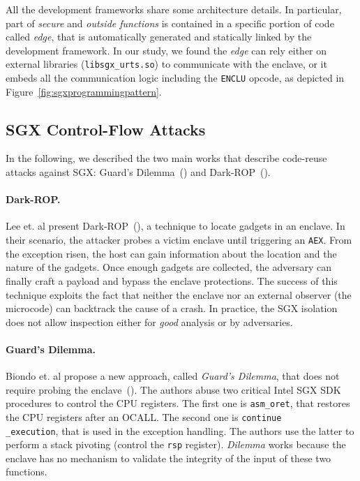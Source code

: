 All the development frameworks share some architecture details.
In particular, part of \emph{secure} and \emph{outside functions} is contained 
in a specific portion of code called \emph{edge}, that is automatically 
generated and statically linked by the development framework.
In our study, we found the \emph{edge} can rely either on external libraries 
(\eg \texttt{libsgx\_urts.so}) to communicate with the enclave, or it embeds
all the communication logic including the \texttt{ENCLU} opcode, as depicted in 
Figure~\ref{fig:sgxprogrammingpattern}.

\subsection{SGX Control-Flow Attacks}
\label{ssec:sgx-control-flow-attacks}

In the following, we described the two main works that describe code-reuse 
attacks against SGX: Guard's Dilemma~(\cite{biondo2018guard}) and 
Dark-ROP~(\cite{lee2017hacking}).

\paragraph{Dark-ROP.}
Lee et. al present Dark-ROP~(\cite{lee2017hacking}), a technique to locate 
gadgets in an enclave.
In their scenario, the attacker probes
a victim enclave until triggering an \texttt{AEX}.
From the exception risen, the host can gain information about the location and 
the nature of the gadgets.
Once enough gadgets are collected, the adversary can finally craft a payload 
and bypass the enclave protections.
The success of this technique exploits the fact that neither the enclave 
nor an external observer (\eg the microcode) can backtrack the cause of a 
crash.
In practice, the SGX isolation does not allow inspection either for 
\emph{good} analysis or by adversaries.

\paragraph{Guard's Dilemma.}
Biondo et. al propose a new approach, called \emph{Guard's Dilemma}, that does 
not require probing the enclave~(\cite{biondo2018guard}).
The authors abuse two critical Intel SGX SDK procedures to control the CPU 
registers.
The first one is \texttt{asm\_oret}, that restores the CPU registers after an  
OCALL.
The second one is \texttt{continue\\\_execution}, that is used in the exception
handling.
The authors use the latter to perform a stack pivoting (\ie control the 
\texttt{rsp} register).
\emph{Dilemma} works because the enclave has no mechanism to validate
the integrity of the input of these two functions.